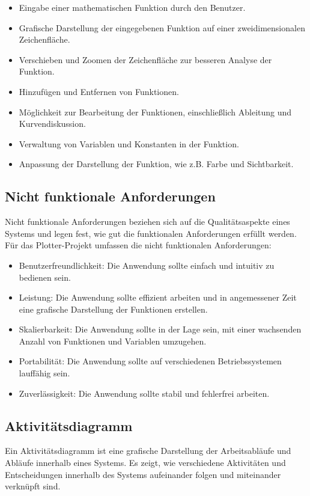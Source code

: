 \documentclass[a4paper]{article}
\begin{document}
\begin{itemize}
	\item Eingabe einer mathematischen Funktion durch den Benutzer.
	\item Grafische Darstellung der eingegebenen Funktion auf einer zweidimensionalen Zeichenfläche.
	\item Verschieben und Zoomen der Zeichenfläche zur besseren Analyse der Funktion.
	\item Hinzufügen und Entfernen von Funktionen.
	\item Möglichkeit zur Bearbeitung der Funktionen, einschließlich Ableitung und Kurvendiskussion.
	\item Verwaltung von Variablen und Konstanten in der Funktion.
	\item Anpassung der Darstellung der Funktion, wie z.B. Farbe und Sichtbarkeit.
\end{itemize}

\subsection{Nicht funktionale Anforderungen}
Nicht funktionale Anforderungen beziehen sich auf die Qualitätsaspekte eines Systems und legen fest, wie gut die funktionalen Anforderungen erfüllt werden. Für das Plotter-Projekt umfassen die nicht funktionalen Anforderungen:

\begin{itemize}
	\item Benutzerfreundlichkeit: Die Anwendung sollte einfach und intuitiv zu bedienen sein.
	\item Leistung: Die Anwendung sollte effizient arbeiten und in angemessener Zeit eine grafische Darstellung der Funktionen erstellen.
	\item Skalierbarkeit: Die Anwendung sollte in der Lage sein, mit einer wachsenden Anzahl von Funktionen und Variablen umzugehen.
	\item Portabilität: Die Anwendung sollte auf verschiedenen Betriebssystemen lauffähig sein.
	\item Zuverlässigkeit: Die Anwendung sollte stabil und fehlerfrei arbeiten.
\end{itemize}

\newpage

\subsection{Aktivitätsdiagramm}
Ein Aktivitätsdiagramm ist eine grafische Darstellung der Arbeitsabläufe und Abläufe innerhalb eines Systems. Es zeigt, wie verschiedene Aktivitäten und Entscheidungen innerhalb des Systems aufeinander folgen und miteinander verknüpft sind.
\end{document}
